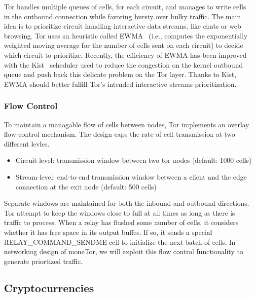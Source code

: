 Tor handles multiple queues of cells, for each circuit, and manages to write
cells in the outbound connection while favoring bursty over bulky traffic. The
main idea is to prioritize circuit handling interactive data streams, like chats
or web browsing. Tor uses an heuristic called EWMA~\cite{ccs10-scheduling}
(i.e., computes the exponentially weighted moving average for the number of
cells sent on each circuit) to decide which circuit to prioritize. Recently, the
efficiency of EWMA has been improved with the Kist~\cite{jansen14-kist}
scheduler used to reduce the congestion on the kernel outbound queue and push
back this delicate problem on the Tor layer. Thanks to Kist, EWMA should better
fulfill Tor's intended interactive streams prioritization. 

\subsubsection{Flow Control}

To maintain a managable flow of cells between nodes, Tor implements an overlay
flow-control mechanism. The design caps the rate of cell transmission at two
different levles.

\begin{itemize}
\item Circuit-level: transmission window between two tor nodes (default: 1000 cells)
\item Stream-level: end-to-end transmission window between a client and the
  edge connection at the exit node (default: 500 cells)
\end{itemize}

Separate windows are maintained for both the inbound and outbound
directions. Tor attempt to keep the windows close to full at all times as long
as there is traffic to process. When a relay has flushed some number of cells,
it considers whether it has free space in its output buffes. If so, it sends a
special RELAY_COMMAND_SENDME cell to initialize the next batch of cells. In
networking design of moneTor, we will exploit this flow control functionality to
generate priortized traffic.

\subsection{Cryptocurrencies}

